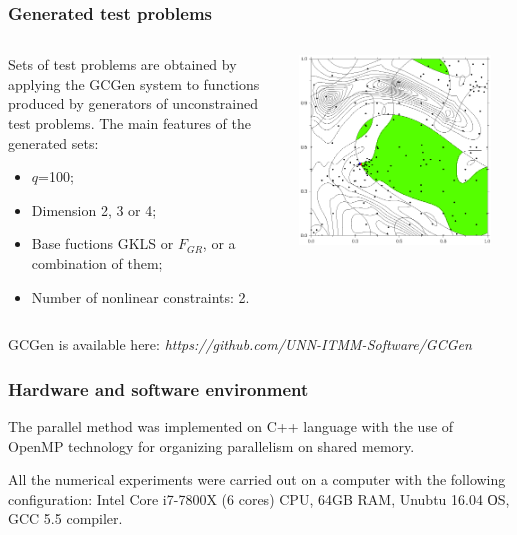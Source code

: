 \documentclass[aspectratio=1610]{beamer}
\begin{document}
\begin{frame}
  \frametitle{Generated test problems}
  \begin{columns}
    \begin{column}{0.5\textwidth}
      Sets of test problems are obtained by applying the GCGen system to
      functions produced by generators of unconstrained test problems.
      The main features of the generated sets:
      \begin{itemize}
        \item \(q\)=100;
        \item Dimension 2, 3 or 4;
        \item Base fuctions GKLS or \(F_{GR}\), or a combination of them;
        \item Number of nonlinear constraints: 2.
      \end{itemize}
    \end{column}
    \begin{column}{0.5\textwidth}
      \centerline{\includegraphics[width=0.9\textwidth]{4.png}}
    \end{column}
  \end{columns}
  \footnotesize{GCGen is available here: \textit{https://github.com/UNN-ITMM-Software/GCGen}}
\end{frame}

\begin{frame}
  \frametitle{Hardware and software environment}
  \begin{center}
    The parallel method was implemented on C++ language with the use of OpenMP
    technology for organizing parallelism on shared memory.

    All the numerical experiments were carried out on a computer with the following
    configuration: Intel Core i7-7800X (6 cores) CPU, 64GB RAM, Unubtu 16.04 ОS, GCC 5.5 compiler.
  \end{center}
\end{frame}
\end{document}
